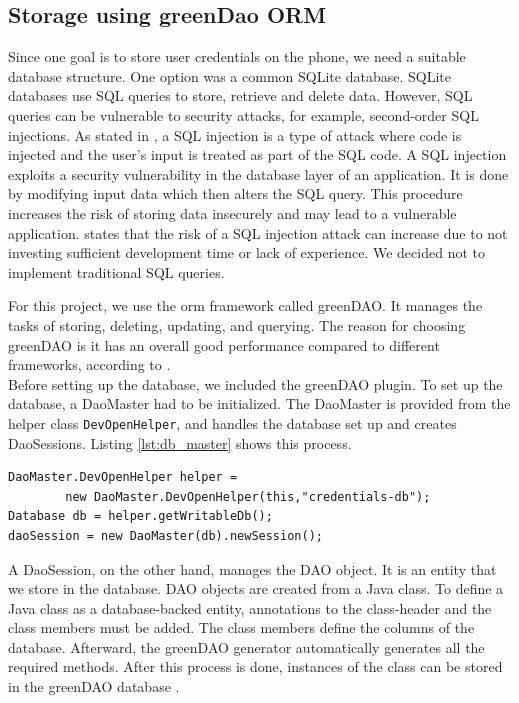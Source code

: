 

\subsection{Storage using greenDao ORM}
Since one goal is to store user credentials on the phone, we need a suitable database structure. One option was a common SQLite database. SQLite databases use SQL queries to store, retrieve and delete data. However, SQL queries can be vulnerable to security attacks, for example, second-order SQL injections. As stated in \cite{Halfond2005}, a SQL injection is a type of attack where code is injected and the user's input is treated as part of the SQL code. A SQL injection exploits a security vulnerability in the database layer of an application. It is done by modifying input data which then alters the SQL query. This procedure increases the risk of storing data insecurely and may lead to a vulnerable application. \cite{katole2018detection} states that the risk of a SQL injection attack can increase due to not investing sufficient development time or lack of experience. We decided not to implement traditional SQL queries.

For this project, we use the \gls{orm} framework called greenDAO. It manages the tasks of storing, deleting, updating, and querying. The reason for choosing greenDAO is it has an overall good performance compared to different frameworks, according to \cite{Greendao}. \\
Before setting up the database, we included the greenDAO plugin. To set up the database, a DaoMaster had to be initialized. The DaoMaster is provided from the helper class \texttt{DevOpenHelper}, and handles the database set up and creates DaoSessions. Listing \ref{lst:db_master} shows this process.

\begin{lstlisting}[float,floatplacement=h, caption=Creation of Database, label=lst:db_master]
DaoMaster.DevOpenHelper helper = 
        new DaoMaster.DevOpenHelper(this,"credentials-db");
Database db = helper.getWritableDb();
daoSession = new DaoMaster(db).newSession();
\end{lstlisting}

A DaoSession, on the other hand, manages the DAO object. It is an entity that we store in the database. DAO objects are created from a Java class. To define a Java class as a database-backed entity, annotations to the class-header and the class members must be added. The class members define the columns of the database. Afterward, the greenDAO generator automatically generates all the required methods. After this process is done, instances of the class can be stored in the greenDAO database \cite{Greendao}.

